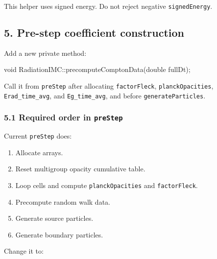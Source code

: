 \documentclass[
]{article}
\newenvironment{Shaded}{}{}
\newcommand{\DataTypeTok}[1]{\textcolor[rgb]{0.56,0.13,0.00}{#1}}
\newcommand{\NormalTok}[1]{#1}
\newcommand{\OperatorTok}[1]{\textcolor[rgb]{0.40,0.40,0.40}{#1}}
\providecommand{\tightlist}{%
  \setlength{\itemsep}{0pt}\setlength{\parskip}{0pt}}
\begin{document}
This helper uses signed energy. Do not reject negative
\texttt{signedEnergy}.

\subsection{5. Pre-step coefficient
construction}\label{pre-step-coefficient-construction}

Add a new private method:

\begin{Shaded}
\begin{Highlighting}[]
\DataTypeTok{void}\NormalTok{ RadiationIMC}\OperatorTok{::}\NormalTok{precomputeComptonData}\OperatorTok{(}\DataTypeTok{double}\NormalTok{ fullDt}\OperatorTok{);}
\end{Highlighting}
\end{Shaded}

Call it from \texttt{preStep} after allocating \texttt{factorFleck},
\texttt{planckOpacities}, \texttt{Erad\_time\_avg}, and
\texttt{Eg\_time\_avg}, and before \texttt{generateParticles}.

\subsubsection{\texorpdfstring{5.1 Required order in
\texttt{preStep}}{5.1 Required order in preStep}}\label{required-order-in-prestep}

Current \texttt{preStep} does:

\begin{enumerate}
\def\labelenumi{\arabic{enumi}.}
\tightlist
\item
  Allocate arrays.
\item
  Reset multigroup opacity cumulative table.
\item
  Loop cells and compute \texttt{planckOpacities} and
  \texttt{factorFleck}.
\item
  Precompute random walk data.
\item
  Generate source particles.
\item
  Generate boundary particles.
\end{enumerate}

Change it to:
\end{document}
